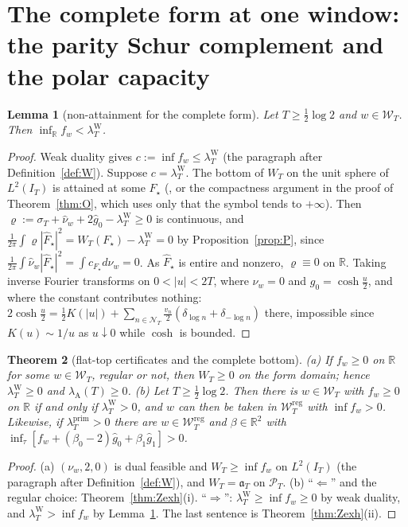 \documentclass[11pt]{amsart}
\newtheorem{theorem}{Theorem}[section]
\newtheorem{lemma}[theorem]{Lemma}
\theoremstyle{definition}
\theoremstyle{remark}
\newcommand{\R}{\mathbb R}
\newcommand{\PT}{\mathcal P_T}
\newcommand{\IT}{I_T}
\newcommand{\lamP}{\lambda^{\mathrm{prim}}_T}
\newcommand{\lamW}{\lambda^{\mathrm W}_T}
\newcommand{\lamA}{\lambda_{\mathrm A}(T)}
\newcommand{\sT}{\sigma_T}
\newcommand{\gh}[1]{\widehat g_{#1}}
\newcommand{\nuh}{\widehat\nu}
\newcommand{\Fh}{\widehat F}
\newcommand{\Wcl}{\mathcal W_T}
\newcommand{\NT}{\mathcal N_T}
\begin{document}
\section{The complete form at one window: the parity Schur complement and the polar capacity}\label{sec:complete}

\begin{lemma}[non-attainment for the complete form]\label{lem:Onat}
Let $T\ge\frac12\log2$ and $w\in\Wcl$. Then $\inf_\R f_w<\lamW$.
\end{lemma}
\begin{proof}
Weak duality gives $c:=\inf f_w\le\lamW$ (the paragraph after Definition~\ref{def:W}). Suppose $c=\lamW$. The
bottom of $W_T$ on the unit sphere of $L^2(\IT)$ is attained at some $F_\star$ (\cite[Thm.~3]{Bombieri2000},
or the compactness argument in the proof of Theorem~\ref{thm:O}, which uses only that the symbol tends to
$+\infty$). Then $\varrho:=\sT+\nuh_w+2\gh0-\lamW\ge0$ is continuous, and
$\frac1{2\pi}\int\varrho|\Fh_\star|^2=W_T(F_\star)-\lamW=0$ by Proposition~\ref{prop:P}, since
$\frac1{2\pi}\int\nuh_w|\Fh_\star|^2=\int c_{F_\star}d\nu_w=0$. As $\Fh_\star$ is entire and nonzero,
$\varrho\equiv0$ on $\R$. Taking inverse Fourier transforms on $0<|u|<2T$, where $\nu_w=0$ and $g_0=\cosh\frac u2$,
and where the constant contributes nothing: $2\cosh\frac u2=\frac12K(|u|)+\sum_{n\in\NT}\frac{v_n}2(\delta_{\log n}+\delta_{-\log n})$
there, impossible since $K(u)\sim1/u$ as $u\downarrow0$ while $\cosh$ is bounded.
\end{proof}

\begin{theorem}[flat-top certificates and the complete bottom]\label{thm:Al}
\emph{(a)} If $f_w\ge0$ on $\R$ for some $w\in\Wcl$, regular or not, then $W_T\ge0$ on the form domain;
hence $\lamW\ge0$ and $\lamA\ge0$.
\emph{(b)} Let $T\ge\frac12\log2$. Then there is $w\in\Wcl$ with $f_w\ge0$ on $\R$ if and only if
$\lamW>0$, and $w$ can then be taken in $\Wcl^{\mathrm{reg}}$ with $\inf f_w>0$. Likewise, if $\lamP>0$
there are $w\in\Wcl^{\mathrm{reg}}$ and $\beta\in\R^2$ with $\inf_\tau[f_w+(\beta_0-2)\gh0+\beta_1\gh1]>0$.
\end{theorem}
\begin{proof}
(a) $(\nu_w,2,0)$ is dual feasible and $W_T\ge\inf f_w$ on $L^2(\IT)$ (the paragraph after
Definition~\ref{def:W}), and $W_T=\mathfrak a_T$ on $\PT$. (b) ``$\Leftarrow$'' and the regular choice:
Theorem~\ref{thm:Zexh}(i). ``$\Rightarrow$'': $\lamW\ge\inf f_w\ge0$ by weak duality, and $\lamW>\inf f_w$ by
Lemma~\ref{lem:Onat}. The last sentence is Theorem~\ref{thm:Zexh}(ii).
\end{proof}
\end{document}
